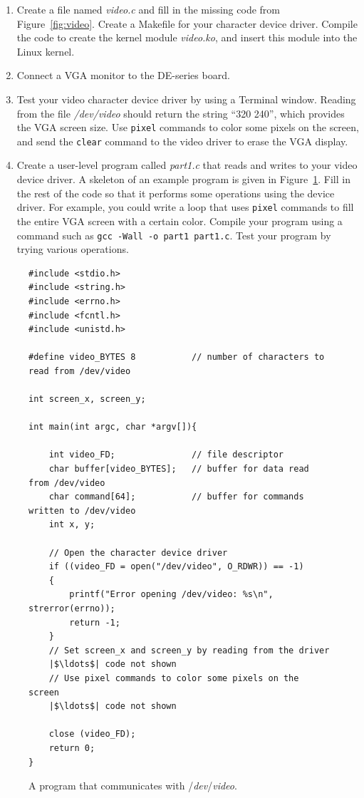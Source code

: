 \documentclass[epsfig,10pt,fullpage]{article}
\begin{document}
\begin{enumerate}
\item Create a file named {\it video.c} and fill in the missing code from Figure~\ref{fig:video}.
Create a Makefile for your character device driver. Compile the code to create the 
kernel module {\it video.ko}, and insert this module into the Linux kernel. 
\item Connect a VGA monitor to the DE-series board.
\item Test your video character device driver by using a Terminal window. Reading from the file
{\it /dev/video} should return the string ``320 240'', which provides the VGA screen size.
Use \texttt{pixel} commands to color some pixels on the screen, and send the 
\texttt{clear} command to the video driver to erase the VGA display.
\item
Create a user-level program called {\it part1.c} that reads and writes to your video device
driver. A skeleton of an example program is given in Figure~\ref{fig:part1}. Fill in the rest 
of the code so that it performs some operations using the device driver. For example, you could 
write a loop that uses \texttt{pixel} commands to fill the entire VGA screen with a certain color.
Compile your program using a command such as \texttt{gcc -Wall -o part1 part1.c}.
Test your program by trying various operations. 
\end{enumerate}

\lstset{language=C,numbers=none}
\begin{figure}[H]
\begin{center}
\begin{minipage}[t]{15 cm}
\begin{lstlisting}[name=part1]
#include <stdio.h>
#include <string.h>
#include <errno.h>
#include <fcntl.h>
#include <unistd.h>

#define video_BYTES 8			// number of characters to read from /dev/video

int screen_x, screen_y;

int main(int argc, char *argv[]){

	int video_FD;				// file descriptor
	char buffer[video_BYTES];	// buffer for data read from /dev/video
	char command[64];			// buffer for commands written to /dev/video
	int x, y;
    
	// Open the character device driver
  	if ((video_FD = open("/dev/video", O_RDWR)) == -1)
	{
		printf("Error opening /dev/video: %s\n", strerror(errno));
		return -1;
	}
	// Set screen_x and screen_y by reading from the driver
	|$\ldots$| code not shown
	// Use pixel commands to color some pixels on the screen
	|$\ldots$| code not shown

	close (video_FD);
	return 0;
}
\end{lstlisting}
\end{minipage}
\vspace{-0.5cm}
\caption{A program that communicates with /{\it dev}/{\it video}.}
\label{fig:part1}
\end{center}
\end{figure}
\end{document}
